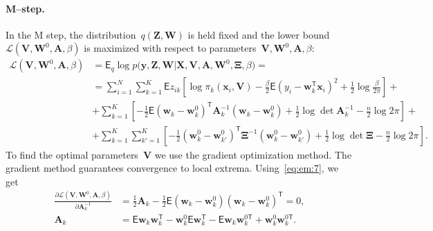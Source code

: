 \documentclass[12pt, twoside]{article}
\begin{document}
\paragraph{M--step.} 
In the M step, the distribution~$q\left(\mathbf{Z}, \mathbf{W}\right)$ is held fixed and the lower bound~$\mathcal{L}\left(\textbf{V}, \textbf{W}^{0}, \textbf{A}, \beta\right)$  is maximized with respect to parameters~$\mathbf{V}, \mathbf{W}^0, \textbf{A},  \beta$:
\[
\label{eq:em:7}
\begin{aligned}
\mathcal{L}\left(\textbf{V}, \textbf{W}^{0}, \textbf{A}, \beta\right) &= \mathsf{E}_{q}\log p\bigr(\mathbf{y}, \mathbf{Z}, \mathbf{W}|\mathbf{X}, \mathbf{V}, \textbf{A}, \textbf{W}^{0}, \bm{\Xi}, \beta\bigr) =  \\
&= \sum_{i=1}^{N}\sum_{k=1}^{K}\mathsf{E}z_{ik}\left[\log\pi_k\left(\textbf{x}_i, \textbf{V}\right) - \frac{\beta}{2}\mathsf{E}\left(y_{i} - \textbf{w}_{k}^{\mathsf{T}}\textbf{x}_{i}\right)^{2} + \frac{1}{2}\log\frac{\beta}{2\pi}\right] +\\
&+ \sum_{k=1}^{K}\left[-\frac{1}{2}\mathsf{E}\left(\textbf{w}_{k} - \textbf{w}_{k}^{0}\right)^{\mathsf{T}}\textbf{A}_{k}^{-1}\left(\textbf{w}_{k} - \textbf{w}_{k}^{0}\right) + \frac{1}{2}\log\det\textbf{A}^{-1}_{k} - \frac{n}{2}\log2\pi\right] +\\
&+ \sum_{k=1}^{K}\sum_{k'=1}^{K}\left[-\frac{1}{2}\left(\textbf{w}_{k}^{0}-\textbf{w}_{k'}^{0}\right)^{\mathsf{T}}\bm{\Xi}^{-1}\left(\textbf{w}_{k}^{0}-\textbf{w}_{k'}^{0}\right) +\frac{1}{2}\log\det\bm{\Xi} -\frac{n}{2}\log{2\pi}\right].
\end{aligned}
\]
To find the optimal parameters~$\textbf{V}$ we use the gradient optimization method.
The gradient method guarantees convergence to local extrema.
Using~\eqref{eq:em:7}, we get
\[
\label{eq:em:9}
\begin{aligned}
\frac{\partial \mathcal{L}\left(\textbf{V}, \textbf{W}^{0}, \textbf{A}, \beta\right)}{\partial \textbf{A}^{-1}_k} &=  \frac{1}{2}\textbf{A}_{k} - \frac{1}{2}\mathsf{E}\left(\textbf{w}_{k} - \textbf{w}_{k}^{0}\right)\left(\textbf{w}_{k} - \textbf{w}_{k}^{0}\right)^{\mathsf{T}} = 0,\\
\textbf{A}_{k} &= \mathsf{E}\textbf{w}_{k}\textbf{w}_{k}^{\mathsf{T}} - \textbf{w}_{k}^{0}\mathsf{E}\textbf{w}_{k}^{\mathsf{T}} - \mathsf{E}\textbf{w}_{k}\textbf{w}_{k}^{0\mathsf{T}} + \textbf{w}_{k}^{0}\textbf{w}_{k}^{0\mathsf{T}}.
\end{aligned}
\]
\end{document}
